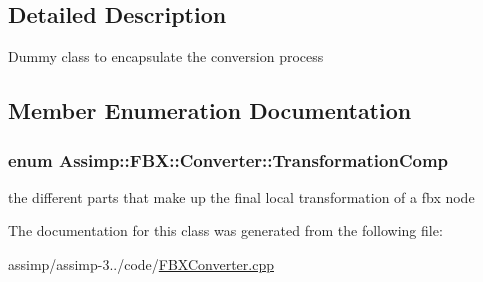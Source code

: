 \subsection{Detailed Description}
Dummy class to encapsulate the conversion process 

\subsection{Member Enumeration Documentation}
\hypertarget{class_assimp_1_1_f_b_x_1_1_converter_a82779d0cf6d795b699e12232fe9ed15e}{
\subsubsection[{Transformation\+Comp}]{\setlength{\rightskip}{0pt plus 5cm}enum {\bf Assimp\+::\+F\+B\+X\+::\+Converter\+::\+Transformation\+Comp}}}\label{class_assimp_1_1_f_b_x_1_1_converter_a82779d0cf6d795b699e12232fe9ed15e}
the different parts that make up the final local transformation of a fbx node 

The documentation for this class was generated from the following file\+:\begin{DoxyCompactItemize}
\item 
assimp/assimp-\/3../code/\hyperlink{_f_b_x_converter_8cpp}{F\+B\+X\+Converter.\+cpp}\end{DoxyCompactItemize}

